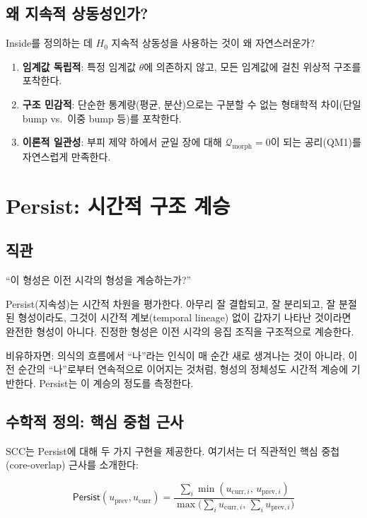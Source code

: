 \subsection{왜 지속적 상동성인가?}

Inside를 정의하는 데 $H_0$ 지속적 상동성을 사용하는 것이 왜 자연스러운가?

\begin{enumerate}
    \item \textbf{임계값 독립적}: 특정 임계값 $\theta$에 의존하지 않고, 모든 임계값에 걸친 위상적 구조를 포착한다.
    \item \textbf{구조 민감적}: 단순한 통계량(평균, 분산)으로는 구분할 수 없는 형태학적 차이(단일 bump vs.\ 이중 bump 등)를 포착한다.
    \item \textbf{이론적 일관성}: 부피 제약 하에서 균일 장에 대해 $\mathcal{Q}_{\mathrm{morph}} = 0$이 되는 공리(QM1)를 자연스럽게 만족한다.
\end{enumerate}


\section{Persist: 시간적 구조 계승}
\label{sec:persist}

\subsection{직관}

``이 형성은 이전 시각의 형성을 계승하는가?''

Persist(지속성)는 시간적 차원을 평가한다. 아무리 잘 결합되고, 잘 분리되고, 잘 분절된 형성이라도, 그것이 시간적 계보(temporal lineage) 없이 갑자기 나타난 것이라면 완전한 형성이 아니다. 진정한 형성은 이전 시각의 응집 조직을 구조적으로 계승한다.

비유하자면: 의식의 흐름에서 ``나''라는 인식이 매 순간 새로 생겨나는 것이 아니라, 이전 순간의 ``나''로부터 연속적으로 이어지는 것처럼, 형성의 정체성도 시간적 계승에 기반한다. Persist는 이 계승의 정도를 측정한다.


\subsection{수학적 정의: 핵심 중첩 근사}

SCC는 Persist에 대해 두 가지 구현을 제공한다. 여기서는 더 직관적인 핵심 중첩(core-overlap) 근사를 소개한다:

\begin{equation}
    \boxed{\mathsf{Persist}(u_{\mathrm{prev}}, u_{\mathrm{curr}}) = \frac{\sum_i \min(u_{\mathrm{curr},i},\, u_{\mathrm{prev},i})}{\max\!\big(\sum_i u_{\mathrm{curr},i},\, \sum_i u_{\mathrm{prev},i}\big)}}
    \label{eq:persist-overlap}
\end{equation}

